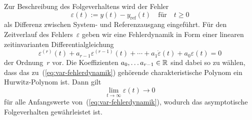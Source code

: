 Zur Beschreibung des Folgeverhaltens wird der Fehler 
\begin{equation}
\varepsilon(t):=y(t)-y_{\text{ref}}(t)\quad\text{für}\quad t\geq0\label{eq:var-ausgangsfehler}
\end{equation}
als Differenz zwischen System- und Referenzausgang eingeführt. Für
den Zeitverlauf des Fehlers~$\varepsilon$ geben wir eine Fehlerdynamik
in Form einer linearen zeitinvarianten Differentialgleichung 
\begin{equation}
\varepsilon^{(r)}(t)+a_{r-1}\varepsilon^{(r-1)}(t)+\cdots+a_{1}\dot{\varepsilon}(t)+a_{0}\varepsilon(t)=0\label{eq:var-fehlerdynamik}
\end{equation}
der Ordnung~$r$ vor. Die Koeffizienten $a_{0},\ldots a_{r-1}\in{\mathbb{R}}$
sind dabei so zu wählen, dass das zu~(\ref{eq:var-fehlerdynamik})
gehörende charakteristische Polynom ein Hurwitz-Polynom ist. Dann
gilt 
\[
\lim_{t\to\infty}\varepsilon(t)\to0
\]
für alle Anfangswerte von~(\ref{eq:var-fehlerdynamik}), wodurch
das asymptotische Folgeverhalten gewährleistet ist.

